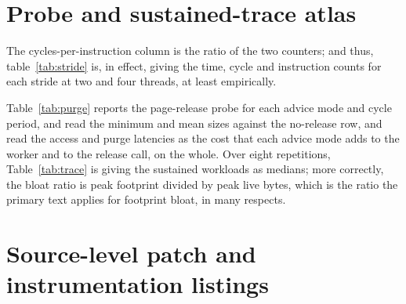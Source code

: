 \documentclass[pdflatex,sn-mathphys-num]{sn-jnl}
\begin{document}
\begin{appendices}
\clearpage

















\clearpage

\section{Probe and sustained-trace atlas}\label{appC}

The cycles-per-instruction column is the ratio of the two counters; and thus, table~\ref{tab:stride} is, in effect, giving the time, cycle and instruction counts for each stride at two and four threads, at least empirically.

Table~\ref{tab:purge} reports the page-release probe for each advice mode and cycle period, and read the minimum and mean sizes against the no-release row, and read the access and purge latencies as the cost that each advice mode adds to the worker and to the release call, on the whole. Over eight repetitions, Table~\ref{tab:trace} is giving the sustained workloads as medians; more correctly, the bloat ratio is peak footprint divided by peak live bytes, which is the ratio the primary text applies for footprint bloat, in many respects.

\clearpage











\clearpage

\section{Source-level patch and instrumentation listings}\label{appD}


\end{appendices}
\end{document}
